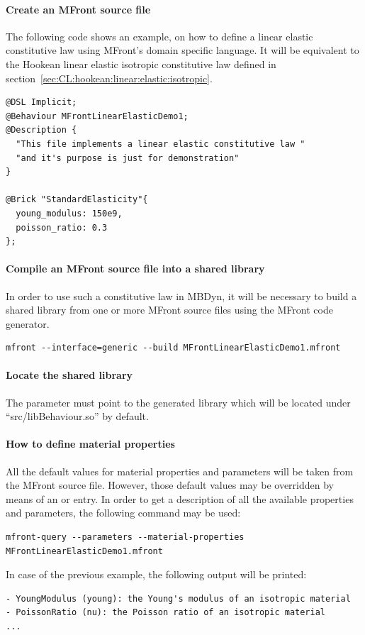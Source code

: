\paragraph{Create an MFront source file}
The following code shows an example, on how to define a linear elastic constitutive law using MFront's domain specific language.
It will be equivalent to the Hookean linear elastic isotropic constitutive law defined in section~\ref{sec:CL:hookean:linear:elastic:isotropic}.
\begin{verbatim}
@DSL Implicit;
@Behaviour MFrontLinearElasticDemo1;
@Description {
  "This file implements a linear elastic constitutive law "
  "and it's purpose is just for demonstration"
}

@Brick "StandardElasticity"{
  young_modulus: 150e9,
  poisson_ratio: 0.3
};
\end{verbatim}
\paragraph{Compile an MFront source file into a shared library}
In order to use such a constitutive law in MBDyn, it will be necessary to build a shared library
from one or more MFront source files using the MFront code generator.
\begin{verbatim}
mfront --interface=generic --build MFrontLinearElasticDemo1.mfront
\end{verbatim}
\paragraph{Locate the shared library}
The parameter  must point to the generated library which will be located under ``src/libBehaviour.so'' by default.
\paragraph{How to define material properties}
All the default values for material properties and parameters will be taken from the MFront source file.
However, those default values may be overridden by means of an  or  entry.
In order to get a description of all the available properties and parameters, the following command may be used:
\begin{verbatim}
mfront-query --parameters --material-properties MFrontLinearElasticDemo1.mfront
\end{verbatim}
In case of the previous example, the following output will be printed:
\begin{verbatim}
- YoungModulus (young): the Young's modulus of an isotropic material
- PoissonRatio (nu): the Poisson ratio of an isotropic material
...
\end{verbatim}

